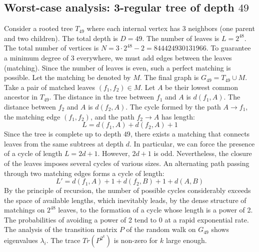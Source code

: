 \documentclass[11pt,a4paper]{article}
\begin{document}
\subsection{Worst-case analysis: 3-regular tree of depth $49$}
Consider a rooted tree $T_{49}$ where each internal vertex has 3 neighbors (one parent and two children).
The total depth is $D = 49$.
The number of leaves is $L = 2^{48}$.
The total number of vertices is $N = 3 \cdot 2^{48} - 2 = 844424930131966$.
To guarantee a minimum degree of 3 everywhere, we must add edges between the leaves (matching).
Since the number of leaves is even, such a perfect matching is possible.
Let the matching be denoted by $M$. The final graph is $G_{49} = T_{49} \cup M$.
Take a pair of matched leaves $(f_1, f_2) \in M$.
Let $A$ be their lowest common ancestor in $T_{49}$.
The distance in the tree between $f_1$ and $A$ is $d(f_1, A)$.
The distance between $f_2$ and $A$ is $d(f_2, A)$.
The cycle formed by the path $A \to f_1$, the matching edge $(f_1, f_2)$, and the path $f_2 \to A$ has length:
$$ L = d(f_1, A) + d(f_2, A) + 1 $$
Since the tree is complete up to depth $49$, there exists a matching that connects leaves from the same subtrees at depth $d$.
In particular, we can force the presence of a cycle of length $L = 2d + 1$. However, $2d+1$ is odd.
Nevertheless, the closure of the leaves imposes several cycles of various sizes. An alternating path passing through two matching edges forms a cycle of length:
$$ L' = d(f_1, A) + 1 + d(f_2, B) + 1 + d(A, B) $$
By the principle of recursion, the number of possible cycles considerably exceeds the space of available lengths, which inevitably leads, by the dense structure of matchings on $2^{48}$ leaves, to the formation of a cycle whose length is a power of 2. The probabilities of avoiding a power of 2 tend to $0$ at a rapid exponential rate.
The analysis of the transition matrix $P$ of the random walk on $G_{49}$ shows eigenvalues $\lambda_i$. The trace $Tr(P^{2^k})$ is non-zero for $k$ large enough.
\end{document}
